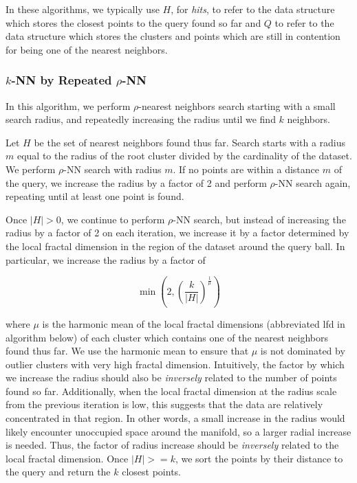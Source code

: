 In these algorithms, we typically use $H$, for \emph{hits}, to refer to the data structure which stores the closest points to the query found so far and
$Q$ to refer to the data structure which stores the clusters and points which are still in contention for being one of the nearest neighbors.


\subsubsection{\texorpdfstring{$k$}{k}-NN by Repeated \texorpdfstring{$\rho$}{p}-NN}
\label{subsubsec:methods:knn-search:repeated-rnn}

In this algorithm, we perform $\rho$-nearest neighbors search starting with a small search radius, and repeatedly increasing the radius until we find $k$ neighbors.

Let $H$ be the set of nearest neighbors found thus far.
Search starts with a radius $m$ equal to the radius of the root cluster divided by the cardinality of the dataset.
We perform $\rho$-NN search with radius $m$. 
If no points are within a distance $m$ of the query, we increase the radius by a factor of 2 and perform $\rho$-NN search again, repeating until at least one point is found.

Once $|H| > 0$, we continue to perform $\rho$-NN search, but instead of increasing the radius by a factor of 2 on each iteration, we increase it by a factor determined by the local fractal dimension in the region of the dataset around the query ball. 
In particular, we increase the radius by a factor of

\begin{equation}
    \min \left(2, \left({\frac{k}{|H|}}\right)^{\frac{1}{\mu}}\right)
    \label{eq:repeated-rnn-factor}
\end{equation}

where $\mu$ is the harmonic mean of the local fractal dimensions (abbreviated lfd in algorithm below) of each cluster which contains one of the nearest neighbors found thus far.
We use the harmonic mean to ensure that $\mu$ is not dominated by outlier clusters with very high fractal dimension. 
Intuitively, the factor by which we increase the radius should also be \emph{inversely} related to the number of points found so far. 
Additionally, when the local fractal dimension at the radius scale from the previous iteration is low, this suggests that the data are relatively concentrated in that region.
In other words, a small increase in the radius would likely encounter unoccupied space around the manifold, so a larger radial increase is needed.
Thus, the factor of radius increase should be \emph{inversely} related to the local fractal dimension.
Once $|H| >= k$, we sort the points by their distance to the query and return the $k$ closest points.

